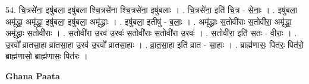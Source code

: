 \documentclass[17pt]{extarticle}
\begin{document}
54. चि॒त्रसे॑ना॒ इषु॑बला॒ इषु॑बला श्चि॒त्रसे॑ना श्चि॒त्रसे॑ना॒ इषु॑बलाः । . चि॒त्रसे॑ना॒ इति॑ चि॒त्र - से॒नाः॒ । . इषु॑बला॒ अमृ॑द्ध्रा॒ अमृ॑द्ध्रा॒ इषु॑बला॒ इषु॑बला॒ अमृ॑द्ध्राः । . इषु॑बला॒ इतीषु॑ - ब॒लाः॒ । . अमृ॑द्ध्राः स॒तोवी॑राः स॒तोवी॑रा॒ अमृ॑द्ध्रा॒ अमृ॑द्ध्राः स॒तोवी॑राः । . स॒तोवी॑रा उ॒रव॑ उ॒रवः॑ स॒तोवी॑राः स॒तोवी॑रा उ॒रवः॑ । . स॒तोवी॑रा॒ इति॑ स॒तः - वी॒राः॒ । . उ॒रवो᳚ व्रातसा॒हा व्रा॑तसा॒हा उ॒रव॑ उ॒रवो᳚ व्रातसा॒हाः । . व्रा॒त॒सा॒हा इति॑ व्रात - सा॒हाः । . ब्राह्म॑णासः॒ पित॑रः॒ पित॑रो॒ ब्राह्म॑णासो॒ ब्राह्म॑णासः॒ पित॑रः । \newline

\textbf{Ghana Paata } \newline
\end{document}
